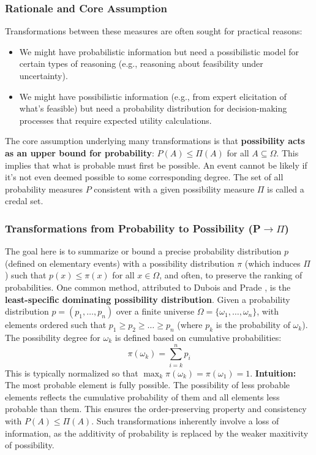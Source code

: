 \subsubsection{Rationale and Core Assumption}
Transformations between these measures are often sought for practical reasons:
\begin{itemize}
    \item We might have probabilistic information but need a possibilistic model for certain types of reasoning (e.g., reasoning about feasibility under uncertainty).
    \item We might have possibilistic information (e.g., from expert elicitation of what's feasible) but need a probability distribution for decision-making processes that require expected utility calculations.
\end{itemize}
The core assumption underlying many transformations is that \textbf{possibility acts as an upper bound for probability}: $P(A) \le \Pi(A)$ for all $A \subseteq \Omega$. This implies that what is probable must first be possible. An event cannot be likely if it's not even deemed possible to some corresponding degree. The set of all probability measures $P$ consistent with a given possibility measure $\Pi$ is called a credal set.

\subsubsection{Transformations from Probability to Possibility (P$\to\Pi$)}
The goal here is to summarize or bound a precise probability distribution $p$ (defined on elementary events) with a possibility distribution $\pi$ (which induces $\Pi$) such that $p(x) \le \pi(x)$ for all $x \in \Omega$, and often, to preserve the ranking of probabilities.
One common method, attributed to Dubois and Prade \cite{DuboisPrade1983}, is the \textbf{least-specific dominating possibility distribution}.
Given a probability distribution $p=(p_1, \dots, p_n)$ over a finite universe $\Omega = \{\omega_1, \dots, \omega_n\}$, with elements ordered such that $p_1 \ge p_2 \ge \dots \ge p_n$ (where $p_k$ is the probability of $\omega_k$). The possibility degree for $\omega_k$ is defined based on cumulative probabilities:
\[ \pi(\omega_k) = \sum_{i=k}^{n} p_i \]
This is typically normalized so that $\max_k \pi(\omega_k) = \pi(\omega_1) = 1$.
\textbf{Intuition:} The most probable element is fully possible. The possibility of less probable elements reflects the cumulative probability of them and all elements less probable than them. This ensures the order-preserving property and consistency with $P(A) \le \Pi(A)$. Such transformations inherently involve a loss of information, as the additivity of probability is replaced by the weaker maxitivity of possibility.

